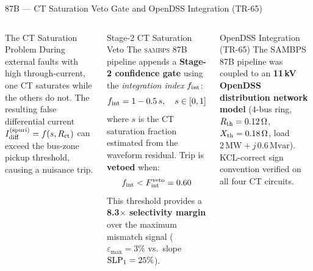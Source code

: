 \documentclass[aspectratio=169, 10pt]{beamer}
\newcommand{\SAMBPS}{\textsc{sambps}}
\begin{document}
\begin{frame}{87B — CT Saturation Veto Gate and OpenDSS Integration (TR-65)}
\begin{columns}[t]
\begin{block}{The CT Saturation Problem}
\footnotesize
During external faults with high through-current, one CT
saturates while the others do not.  The resulting false
differential current $I_{\rm diff}^{\rm(spuri)} = f(s, R_{\rm ct})$
can exceed the bus-zone pickup threshold, causing a nuisance trip.
\end{block}
\vspace{4pt}
\begin{block}{Stage-2 CT Saturation Veto}
\footnotesize
The \SAMBPS{} 87B pipeline appends a \textbf{Stage-2 confidence gate}
using the \emph{integration index} $f_{\rm int}$:
\[
  f_{\rm int} = 1 - 0.5\,s, \quad s \in [0,1]
\]
where $s$ is the CT saturation fraction estimated from the
waveform residual.  Trip is \textbf{vetoed} when:
\[
  f_{\rm int} < F_{\rm int}^{\rm veto} = 0.60
\]
This threshold provides a \textbf{8.3$\times$ selectivity margin}
over the maximum mismatch signal ($\varepsilon_{\max} = 3\%$
vs.\ slope ${\rm SLP}_1 = 25\%$).
\end{block}
\vspace{4pt}
\begin{block}{OpenDSS Integration (TR-65)}
\footnotesize
The SAMBPS 87B pipeline was coupled to an \textbf{11\,kV OpenDSS
distribution network model} (4-bus ring, $R_{\rm th}=0.12\,\Omega$,
$X_{\rm th}=0.18\,\Omega$, load $2\,\text{MW}+j\,0.6\,\text{Mvar}$).
KCL-correct sign convention verified on all four CT circuits.
\end{block}


\end{columns}
\end{frame}
\end{document}
